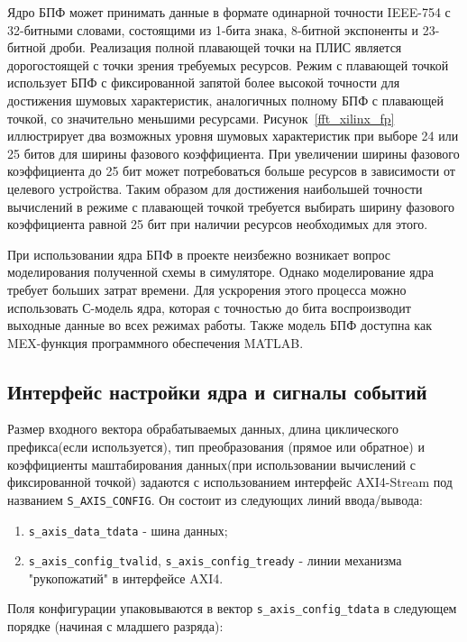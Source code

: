 Ядро БПФ может принимать данные в формате одинарной точности IEEE-754 с 32-битными словами, состоящими из 1-бита знака, 8-битной экспоненты и 23-битной дроби. Реализация полной плавающей точки на ПЛИС является дорогостоящей с точки зрения требуемых ресурсов. Режим с плавающей точкой использует БПФ с фиксированной запятой более высокой точности для достижения шумовых характеристик, аналогичных полному БПФ с плавающей точкой, со значительно меньшими ресурсами. Рисунок~\ref{fft_xilinx_fp} иллюстрирует два возможных уровня шумовых характеристик при выборе 24 или 25 битов для ширины фазового коэффициента. При увеличении ширины фазового коэффициента до 25 бит может потребоваться больше ресурсов в зависимости от целевого устройства. Таким образом для достижения наибольшей точности вычислений в режиме с плавающей точкой требуется выбирать ширину фазового коэффициента равной 25 бит при наличии ресурсов необходимых для этого.

При использовании ядра БПФ в проекте неизбежно возникает вопрос моделирования полученной схемы в симуляторе. Однако моделирование ядра требует больших затрат времени. Для ускрорения этого процесса можно использовать С-модель ядра, которая с точностью до бита воспроизводит выходные данные во всех режимах работы. Также модель БПФ доступна как MEX-функция программного обеспечения MATLAB.

\subsection{Интерфейс настройки ядра и сигналы событий}

Размер входного вектора обрабатываемых данных, длина циклического префикса(если используется), тип преобразования (прямое или обратное) и коэффициенты маштабирования данных(при использовании вычислений с фиксированной точкой) задаются с использованием интерфейс AXI4-Stream под названием \verb|S_AXIS_CONFIG|. 
Он состоит из следующих линий ввода/вывода: 

\begin{enumerate}
	\item \verb|s_axis_data_tdata| - шина данных;
	\item \verb|s_axis_config_tvalid|, \verb|s_axis_config_tready| - линии механизма "рукопожатий" в интерфейсе AXI4.
\end{enumerate}

Поля конфигурации упаковываются в вектор \verb|s_axis_config_tdata| в следующем порядке (начиная с младшего разряда):

